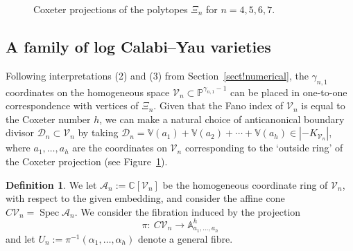 \documentclass[10pt,a4paper]{amsart}
\numberwithin{equation}{section}
\theoremstyle{definition}
\newtheorem{defn}[thm]{Definition}
\newcommand{\Aa}{\mathbb{A}}
\newcommand{\CC}{\mathbb{C}}
\newcommand{\VV}{\mathbb{V}}
\DeclareMathOperator{\Spec}{Spec}
\begin{document}
\begin{figure}[ht!]
\caption{Coxeter projections of the polytopes $\Xi_n$ for $n=4,5,6,7$.}\label{fig!polytopes}
\end{figure}

\subsection{A family of log Calabi--Yau varieties}
Following interpretations (2) and (3) from Section~\ref{sect!numerical}, the $\gamma_{n,1}$ coordinates on the homogeneous space $\mathcal V_n\subset \mathbb{P}^{\gamma_{n,1}-1}$ can be placed in one-to-one correspondence with vertices of $\Xi_n$. Given that the Fano index of $\mathcal V_n$ is equal to the Coxeter number $h$, we can make a natural choice of anticanonical boundary divisor $\mathcal D_n\subset \mathcal V_n$ by taking
$\mathcal D_n = \VV(a_1) + \VV(a_2) + \cdots + \VV(a_h) \in |{-K_{\mathcal V_n}}|$,
where $a_1,\ldots,a_h$ are the coordinates on $\mathcal V_n$ corresponding to the `outside ring' of the Coxeter projection (see Figure~\ref{fig!polytopes}).

\begin{defn}
We let $\mathcal A_n := \CC[\mathcal V_n]$ be the homogeneous coordinate ring of $\mathcal V_n$, with respect to the given embedding, and consider the affine cone $C\mathcal V_n = \Spec \mathcal A_n$. We consider the fibration induced by the projection
\[ \pi\colon\ C\mathcal V_n \to \Aa^{h}_{a_1,\ldots,a_{h}}\]
and let $U_n := \pi^{-1}(\alpha_1, \ldots, \alpha_h)$ denote a general fibre.
\end{defn}
\end{document}
